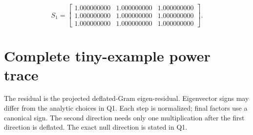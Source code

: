 \documentclass[11pt]{article}
\begin{document}
\noindent\begin{minipage}[t]{.48\textwidth}\footnotesize\setlength{\arraycolsep}{3pt}\[ S_1=\begin{bmatrix}1.000000000 & 1.000000000 & 1.000000000\\1.000000000 & 1.000000000 & 1.000000000\\1.000000000 & 1.000000000 & 1.000000000\end{bmatrix}. \]
\end{minipage}\par

\clearpage
\section{Complete tiny-example power trace}
The residual is the projected deflated-Gram eigen-residual.
Eigenvector signs may differ from the analytic choices in Q1.
Each step is normalized; final factors use a canonical sign.
The second direction needs only one multiplication after the first
direction is deflated. The exact null direction is stated in Q1.
\end{document}
